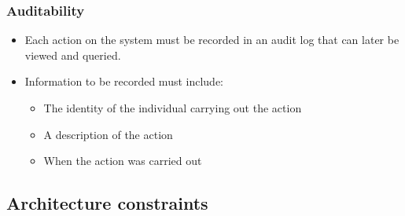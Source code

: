 \documentclass[11pt,a4paper]{article}
\begin{document}
		\subsubsection{Auditability}
		\begin{itemize}
			\item Each action on the system must be recorded in an audit log that can later be viewed and queried.
			\item Information to be recorded must include:
			\begin{itemize}
				\item The identity of the individual carrying out the action
				\item A description of the action
				\item When the action was carried out
			\end{itemize}
		\end{itemize}
		 
	\subsection{ Architecture constraints}
 
\end{document}
